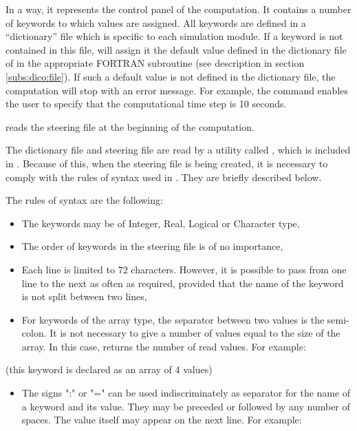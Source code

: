 In a way, it represents the control panel of the computation.
It contains a number of keywords to which values are assigned.
All keywords are defined in a ``dictionary'' file which is specific to each
simulation module.
If a keyword is not contained in this file,  will assign it
the default value defined in the dictionary file of in the appropriate FORTRAN
subroutine (see description in section \ref{subs:dico:file}).
If such a default value is not defined in the dictionary file,
the computation will stop with an error message.
For example, the command  enables the user to specify
that the computational time step is 10 seconds.

 reads the steering file at the beginning of the computation.

The dictionary file and steering file are read by a utility called \damo,
which is included in \tel.
Because of this, when the steering file is being created, it is necessary
to comply with the rules of syntax used in \damo.
They are briefly described below.

The rules of syntax are the following:

\begin{itemize}
\item The keywords may be of Integer, Real, Logical or Character type,

\item The order of keywords in the steering file is of no importance,

\item Each line is limited to 72 characters.
However, it is possible to pass from one line to the next as often as required,
provided that the name of the keyword is not split between two lines,

\item For keywords of the array type, the separator between two values is the
semi-colon.
It is not necessary to give a number of values equal to the size of the array.
In this case, \damo returns the number of read values. For example:
\end{itemize}


 (this keyword is declared as an array of 4 values)

\begin{itemize}
\item The signs ":" or "=" can be used indiscriminately as separator
for the name of a keyword and its value.
They may be preceded or followed by any number of spaces.
The value itself may appear on the next line. For example:
\end{itemize}

